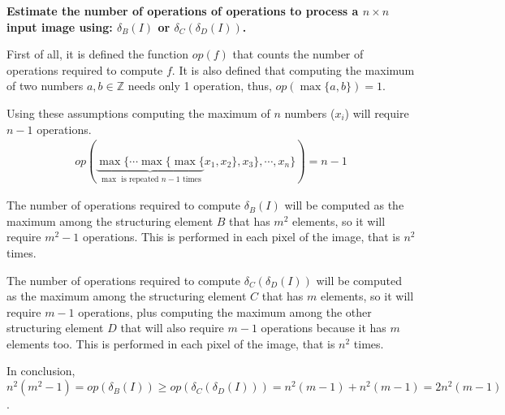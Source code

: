 \documentclass[12pt]{article}
\begin{document}
{
\bfseries 
Estimate the number of operations of operations to process a $n \times n$ input image using: $\delta_B(I)$ or $\delta_C\left(\delta_D \left( I \right) \right)$.
} 

\begin{center}
\end{center}

First of all, it is defined the function $op(f)$ that counts the number of operations required to compute $f$. It is also defined that computing the maximum of two numbers $a, b \in \mathbb{Z}$ needs only 1 operation, thus, $op\left(\max\{a, b\}\right) = 1$.

Using these assumptions computing the maximum of $n$ numbers ($x_i$) will require $n - 1$ operations.
\begin{gather*}
    op(\underbrace{\max\{\cdots\max\{\max\{}_{\max{} \text{ is repeated } n - 1 \text{ times}}x_1, x_2\}, x_3\},\cdots,x_n\}) = n - 1
\end{gather*}

The number of operations required to compute $\delta_B(I)$ will be computed as the maximum among the structuring element $B$ that has $m^2$ elements, so it will require $m^2 - 1$ operations. This is performed in each pixel of the image, that is $n^2$ times.

The number of operations required to compute $\delta_C\left(\delta_D \left( I \right) \right)$ will be computed as the maximum among the structuring element $C$ that has $m$ elements, so it will require $m - 1$ operations, plus computing the maximum among the other structuring element $D$ that will also require $m - 1$ operations because it has $m$ elements too. This is performed in each pixel of the image, that is $n^2$ times.

In conclusion, 
    $$
        n^2(m^2 - 1) = op\left(\delta_B(I)\right) \geq op\left(\delta_C\left(\delta_D \left( I \right) \right)\right) = n^2(m - 1) + n^2(m - 1) = 2n^2(m - 1)
    $$.
\end{document}
